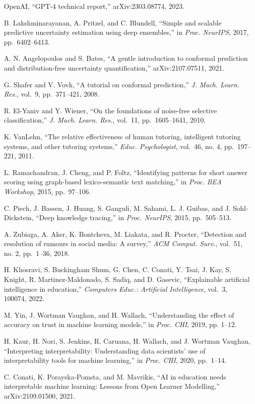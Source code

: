 OpenAI, ``GPT-4 technical report,'' arXiv:2303.08774, 2023.

B. Lakshminarayanan, A. Pritzel, and C. Blundell, ``Simple and scalable predictive uncertainty estimation using deep ensembles,'' in \emph{Proc. NeurIPS}, 2017, pp.~6402--6413.

A. N. Angelopoulos and S. Bates, ``A gentle introduction to conformal prediction and distribution-free uncertainty quantification,'' arXiv:2107.07511, 2021.

G. Shafer and V. Vovk, ``A tutorial on conformal prediction,'' \emph{J. Mach. Learn. Res.}, vol.~9, pp.~371--421, 2008.

R. El-Yaniv and Y. Wiener, ``On the foundations of noise-free selective classification,'' \emph{J. Mach. Learn. Res.}, vol.~11, pp.~1605--1641, 2010.

K. VanLehn, ``The relative effectiveness of human tutoring, intelligent tutoring systems, and other tutoring systems,'' \emph{Educ. Psychologist}, vol.~46, no. 4, pp.~197--221, 2011.

L. Ramachandran, J. Cheng, and P. Foltz, ``Identifying patterns for short answer scoring using graph-based lexico-semantic text matching,'' in \emph{Proc. BEA Workshop}, 2015, pp.~97--106.

C. Piech, J. Bassen, J. Huang, S. Ganguli, M. Sahami, L. J. Guibas, and J. Sohl-Dickstein, ``Deep knowledge tracing,'' in \emph{Proc. NeurIPS}, 2015, pp.~505--513.

A. Zubiaga, A. Aker, K. Bontcheva, M. Liakata, and R. Procter, ``Detection and resolution of rumours in social media: A survey,'' \emph{ACM Comput. Surv.}, vol.~51, no. 2, pp.~1--36, 2018.

H. Khosravi, S. Buckingham Shum, G. Chen, C. Conati, Y. Tsai, J. Kay, S. Knight, R. Martinez-Maldonado, S. Sadiq, and D. Gasevic, ``Explainable artificial intelligence in education,'' \emph{Computers Educ.: Artificial Intelligence}, vol.~3, 100074, 2022.

M. Yin, J. Wortman Vaughan, and H. Wallach, ``Understanding the effect of accuracy on trust in machine learning models,'' in \emph{Proc. CHI}, 2019, pp. 1--12.

H. Kaur, H. Nori, S. Jenkins, R. Caruana, H. Wallach, and J. Wortman Vaughan, ``Interpreting interpretability: Understanding data scientists' use of interpretability tools for machine learning,'' in \emph{Proc. CHI}, 2020, pp.~1--14.

C. Conati, K. Porayska-Pomsta, and M. Mavrikis, ``AI in education needs interpretable machine learning: Lessons from Open Learner Modelling,'' arXiv:2109.01500, 2021.

